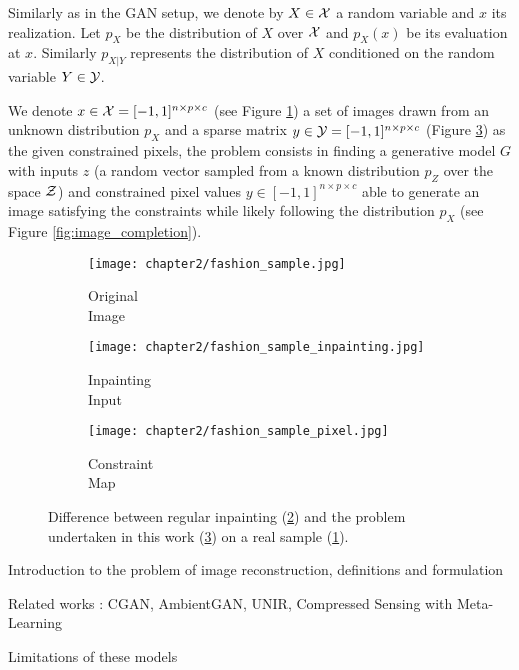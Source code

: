 Similarly as in the GAN setup, we denote  by $X \in \mathcal{X}$ a random variable and $x$ its realization. Let $p_X$ be the distribution of $X$ over $\mathcal{X}$ and $p_X(x)$ be its evaluation at $x$. Similarly $p_{X|Y}$ represents the distribution of $X$ conditioned on the random variable $Y \in \mathcal{Y}$. 

We denote $x \in \mathcal{X} = [-1, 1]^{n\times p\times c}$  (see Figure \ref{fig:digit}) a set of images drawn from an unknown distribution $p_X$  and a sparse matrix  $y \in  \mathcal{Y} = [-1, 1]^{n\times p\times c}$ (Figure \ref{fig:pixelwise_gen}) as the given constrained pixels, the problem consists in finding a generative model $G$ with inputs $z$ (a random vector sampled from a known distribution $p_Z$ over the space $\mathcal{Z}$) and constrained pixel values $y \in  [-1, 1]^{n\times p\times c}$ able to generate an image satisfying the constraints while likely following the distribution $p_X$ (see Figure \ref{fig:image_completion}).

\begin{figure}[t]
	\centering
	\begin{subfigure}[t]{0.33\textwidth}
		\centering
		\texttt{[image: chapter2/fashion\_sample.jpg]}
		\caption{Original \\ Image}
		\label{fig:digit}
	\end{subfigure}\begin{subfigure}[t]{0.33\textwidth}
		\centering
		\texttt{[image: chapter2/fashion\_sample\_inpainting.jpg]}
		\caption{Inpainting\\Input}
		\label{fig:inpainting}
	\end{subfigure}\begin{subfigure}[t]{0.33\textwidth}
		\centering
		\texttt{[image: chapter2/fashion\_sample\_pixel.jpg]}
		\caption{Constraint\\Map}
		\label{fig:pixelwise_gen}
	\end{subfigure}
	\caption{Difference between regular inpainting (\ref{fig:inpainting}) and the problem undertaken in this work (\ref{fig:pixelwise_gen}) on a real sample (\ref{fig:digit}).}
	\label{fig:image_completion_task}
\end{figure}

	
Introduction to the problem of image reconstruction, definitions and formulation

Related works : CGAN, AmbientGAN, UNIR,  Compressed Sensing with Meta-Learning

Limitations of these models

